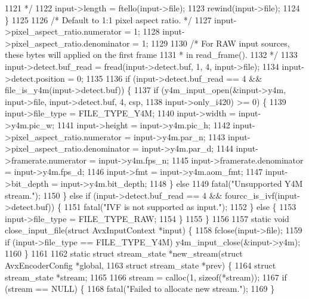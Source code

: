 \begin{DoxyCodeInclude}
{{{{{{{{{{{{{{{1121 \textcolor{comment}{     */}
1122     input->length = ftello(input->file);
1123     rewind(input->file);
1124   \}
1125 
1126   \textcolor{comment}{/* Default to 1:1 pixel aspect ratio. */}
1127   input->pixel\_aspect\_ratio.numerator = 1;
1128   input->pixel\_aspect\_ratio.denominator = 1;
1129 
1130   \textcolor{comment}{/* For RAW input sources, these bytes will applied on the first frame}
1131 \textcolor{comment}{   *  in read\_frame().}
1132 \textcolor{comment}{   */}
1133   input->detect.buf\_read = fread(input->detect.buf, 1, 4, input->file);
1134   input->detect.position = 0;
1135 
1136   \textcolor{keywordflow}{if} (input->detect.buf\_read == 4 && file\_is\_y4m(input->detect.buf)) \{
1137     \textcolor{keywordflow}{if} (y4m\_input\_open(&input->y4m, input->file, input->detect.buf, 4, csp,
1138                        input->only\_i420) >= 0) \{
1139       input->file\_type = FILE\_TYPE\_Y4M;
1140       input->width = input->y4m.pic\_w;
1141       input->height = input->y4m.pic\_h;
1142       input->pixel\_aspect\_ratio.numerator = input->y4m.par\_n;
1143       input->pixel\_aspect\_ratio.denominator = input->y4m.par\_d;
1144       input->framerate.numerator = input->y4m.fps\_n;
1145       input->framerate.denominator = input->y4m.fps\_d;
1146       input->fmt = input->y4m.aom\_fmt;
1147       input->bit\_depth = input->y4m.bit\_depth;
1148     \} \textcolor{keywordflow}{else}
1149       fatal(\textcolor{stringliteral}{"Unsupported Y4M stream."});
1150   \} \textcolor{keywordflow}{else} \textcolor{keywordflow}{if} (input->detect.buf\_read == 4 && fourcc\_is\_ivf(input->detect.buf)) \{
1151     fatal(\textcolor{stringliteral}{"IVF is not supported as input."});
1152   \} \textcolor{keywordflow}{else} \{
1153     input->file\_type = FILE\_TYPE\_RAW;
1154   \}
1155 \}
1156 
1157 \textcolor{keyword}{static} \textcolor{keywordtype}{void} close\_input\_file(\textcolor{keyword}{struct} AvxInputContext *input) \{
1158   fclose(input->file);
1159   \textcolor{keywordflow}{if} (input->file\_type == FILE\_TYPE\_Y4M) y4m\_input\_close(&input->y4m);
1160 \}
1161 
1162 \textcolor{keyword}{static} \textcolor{keyword}{struct }stream\_state *new\_stream(\textcolor{keyword}{struct} AvxEncoderConfig *global,
1163                                        \textcolor{keyword}{struct} stream\_state *prev) \{
1164   \textcolor{keyword}{struct }stream\_state *stream;
1165 
1166   stream = calloc(1, \textcolor{keyword}{sizeof}(*stream));
1167   \textcolor{keywordflow}{if} (stream == NULL) \{
1168     fatal(\textcolor{stringliteral}{"Failed to allocate new stream."});
1169   \}
}}}}}}}}}}}}}}}
\end{DoxyCodeInclude}
